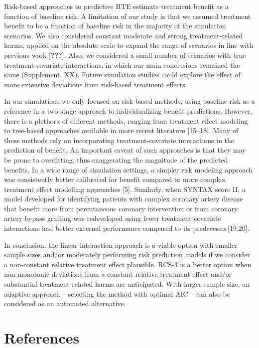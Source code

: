 \documentclass[]{elsarticle} %
\begin{document}
Risk-based approaches to predictive HTE estimate treatment benefit as a
function of baseline risk. A limitation of our study is that we assumed
treatment benefit to be a function of baseline risk in the majority of
the simulation scenarios. We also considered constant moderate and
strong treatment-related harms, applied on the absolute scale to expand
the range of scenarios in line with previous work {[}{\textbf{???}}{]}.
Also, we considered a small number of scenarios with true
treatment-covariate interactions, in which our main conclusions remained
the same (Supplement, XX). Future simulation studies could explore the
effect of more extensive deviations from risk-based treatment effects.

In our simulations we only focused on risk-based methods, using baseline
risk as a reference in a two-stage approach to individualizing benefit
predictions. However, there is a plethora of different methods, ranging
from treatment effect modeling to tree-based approaches available in
more recent literature {[}15--18{]}. Many of these methods rely on
incorporating treatment-covariate interactions in the prediction of
benefit. An important caveat of such approaches is that they may be
prone to overfitting, thus exaggerating the magnitude of the predicted
benefits. In a wide range of simulation settings, a simpler risk
modeling approach was consistently better calibrated for benefit
compared to more complex treatment effect modelling approaches {[}5{]}.
Similarly, when SYNTAX score II, a model developed for identifying
patients with complex coronary artery disease that benefit more from
percutaneous coronary intervention or from coronary artery bypass
grafting was redeveloped using fewer treatment-covariate interactions
had better external performance compared to its predecessor{[}19,20{]}.

In conclusion, the linear interaction approach is a viable option with
smaller sample sizes and/or moderately performing risk prediction models
if we consider a non-constant relative treatment effect plausible. RCS-3
is a better option when non-monotonic deviations from a constant
relative treatment effect and/or substantial treatment-related harms are
anticipated. With larger sample size, an adaptive approach -- selecting
the method with optimal AIC -- can also be considered as an automated
alternative.

\newpage

\hypertarget{references}{%
\section{References}\label{references}}
\end{document}
